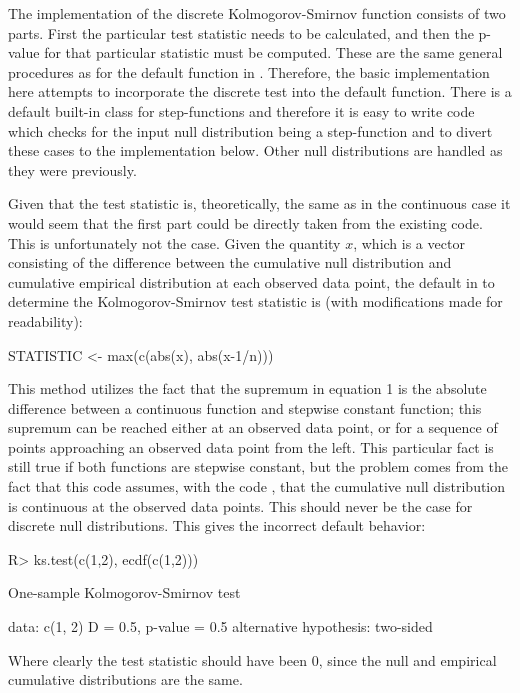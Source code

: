 \documentclass[article]{jss}
\begin{document}
The implementation of the discrete Kolmogorov-Smirnov function consists of two parts. First the particular test statistic needs to be calculated,
and then the p-value for that particular statistic must be computed. These are the same general procedures as for the default function 
 in . Therefore, the basic implementation here attempts to incorporate the discrete test into the default function. There is
a default built-in class for step-functions and therefore it is easy to write code which checks for the input null distribution being a step-function
and to divert these cases to the implementation below. Other null distributions are handled as they were previously.

Given that the test statistic is, theoretically, the same as in the
continuous case it would seem that the first part could be directly taken from the existing code. This is unfortunately not the case. Given the
quantity $x$, which is a vector consisting of the difference between the cumulative null distribution and cumulative empirical distribution at each
observed data point, the default in  to determine the Kolmogorov-Smirnov test statistic is (with modifications made for readability):
\begin{CodeChunk}
\begin{CodeInput}
  STATISTIC <- max(c(abs(x), abs(x-1/n)))
\end{CodeInput}
\end{CodeChunk}
This method utilizes the fact that the supremum in equation 1 is the absolute difference between a continuous function and stepwise constant
function; this supremum can be reached either at an observed data point, or for a sequence of points approaching an observed data point from the 
left. This particular fact is still true if both functions are stepwise constant, but the problem comes from the fact that this code assumes, with the code
, that the cumulative null distribution is continuous at the observed data points. This should never be the case for discrete null
distributions. This gives the incorrect default behavior:
\begin{CodeChunk}
\begin{CodeInput}
  R>  ks.test(c(1,2), ecdf(c(1,2))) 
\end{CodeInput}
\begin{CodeOutput}
	One-sample Kolmogorov-Smirnov test

  data:  c(1, 2) 
  D = 0.5, p-value = 0.5
  alternative hypothesis: two-sided 
\end{CodeOutput}
\end{CodeChunk}
Where clearly the test statistic should have been $0$, since the null and empirical cumulative distributions are the same. 
\end{document}
